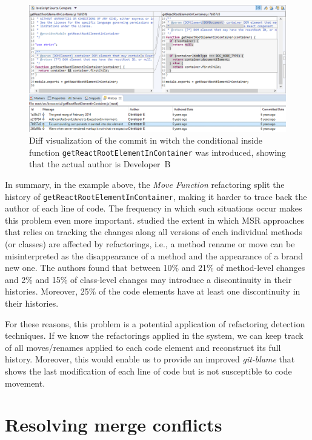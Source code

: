 \begin{figure}[htbp]
\centering
\includegraphics[width=\linewidth]{img/git-blame-react-actual-author.png}
\caption{Diff visualization of the commit in witch the conditional inside function \texttt{getReactRootElementInContainer} was introduced, showing that the actual author is Developer~B}
\label{FigGitBlameReactActualAuthor}
\end{figure}

In summary, in the example above, the \textit{Move Function} refactoring split the history of \texttt{getReactRootElementInContainer}, making it harder to trace back the author of each line of code.
The frequency in which such situations occur makes this problem even more important. \cite{icse2018} studied the extent in which MSR approaches that relies on tracking
the changes along all versions of each individual methods (or classes) are affected by refactorings, i.e., a method rename or move can be misinterpreted as the disappearance of a method and the appearance of a brand new one.
The authors found that between 10\% and 21\% of method-level changes and 2\% and 15\% of class-level changes may introduce a discontinuity in their histories.
Moreover, 25\% of the code elements have at least one discontinuity in their histories.

For these reasons, this problem is a potential application of refactoring detection techniques. If we know the refactorings applied in the system, we can keep track of all moves/renames applied to each code element and reconstruct its full history.
Moreover, this would enable us to provide an improved \textit{git-blame} that shows the last modification of each line of code but is not susceptible to code movement.



\section{Resolving merge conflicts}
\label{SecAppMerge}

